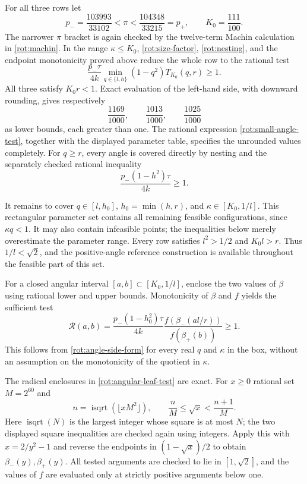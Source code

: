\documentclass[11pt,reqno]{amsart}
\numberwithin{equation}{section}
\begin{document}
For all three rows let
\begin{equation}\label{rot:exact-constants}
 p_- =\frac{103993}{33102}<\pi<\frac{104348}{33215}=p_+,
 \qquad K_0=\frac{111}{100}.
\end{equation}
The narrower $\pi$ bracket is again checked by the twelve-term Machin
calculation in \eqref{rot:machin}. In the range $\kappa\leq K_0$,
\eqref{rot:size-factor}, \eqref{rot:nesting}, and the endpoint
monotonicity proved above reduce the whole row to the rational test
\begin{equation}\label{rot:small-angle-test}
 \frac{p_-\tau}{4k}
    \min_{q\in\{l,h\}}(1-q^2)T_{K_0}(q,r)\geq1.
\end{equation}
All three satisfy $K_0r<1$. Exact evaluation of the left-hand side,
with downward rounding, gives respectively
\[
 \frac{1169}{1000},\qquad\frac{1013}{1000},\qquad\frac{1025}{1000}
\]
as lower bounds, each greater than one. The rational expression
\eqref{rot:small-angle-test}, together with the displayed parameter
table, specifies the unrounded values completely. For $q\geq r$,
every angle is covered directly
by nesting and the separately checked rational inequality
\begin{equation}\label{rot:direct-high-q-test}
 \frac{p_-(1-h^2)\tau}{4k}\geq1.
\end{equation}

It remains to cover $q\in[l,h_0]$, $h_0=\min(h,r)$, and
$\kappa\in[K_0,1/l]$. This rectangular parameter set contains all
remaining feasible configurations, since $\kappa q<1$. It may also
contain infeasible points; the inequalities below merely overestimate
the parameter range. Every row satisfies $l^2>1/2$ and $K_0l>r$.
Thus $1/l<\sqrt2$, and the positive-angle reference construction is
available throughout the feasible part of this set.

For a closed angular interval $[a,b]\subset[K_0,1/l]$, enclose the two
values of $\beta$ using rational lower and upper bounds. Monotonicity
of $\beta$ and $f$ yields the sufficient test
\begin{equation}\label{rot:angular-leaf-test}
 \mathcal R(a,b)=
 \frac{p_-(1-h_0^2)\tau}{4k}
 \frac{f(\beta_-(al/r))}{f(\beta_+(b))}\geq1.
\end{equation}
This follows from \eqref{rot:angle-side-form} for every real $q$ and
$\kappa$ in the box, without an assumption on the monotonicity of the
quotient in $\kappa$.

The radical enclosures in \eqref{rot:angular-leaf-test} are exact.
For $x\geq0$ rational set $M=2^{60}$ and
\[
 n=\operatorname{isqrt}(\lfloor xM^2\rfloor),\qquad
 \frac nM\leq\sqrt{x}<\frac{n+1}{M}.
\]
Here $\operatorname{isqrt}(N)$ is the largest integer whose square is
at most $N$; the two displayed square inequalities are checked again
using integers. Apply this with $x=2/y^2-1$ and reverse the endpoints
in $(1-\sqrt{x})/2$ to obtain $\beta_-(y),\beta_+(y)$. All tested
arguments are checked to lie in $[1,\sqrt2]$, and the values of $f$
are evaluated only at strictly positive arguments below one.
\end{document}
